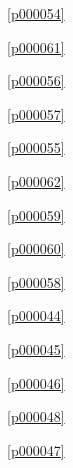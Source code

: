 \noindent\figurename\ \ref{p000054}\dotfill\pageref{p000054}

\noindent\figurename\ \ref{p000061}\dotfill\pageref{p000061}

\noindent\figurename\ \ref{p000056}\dotfill\pageref{p000056}

\noindent\figurename\ \ref{p000057}\dotfill\pageref{p000057}

\noindent\figurename\ \ref{p000055}\dotfill\pageref{p000055}

\noindent\figurename\ \ref{p000062}\dotfill\pageref{p000062}

\noindent\figurename\ \ref{p000059}\dotfill\pageref{p000059}

\noindent\figurename\ \ref{p000060}\dotfill\pageref{p000060}

\noindent\figurename\ \ref{p000058}\dotfill\pageref{p000058}

\noindent\figurename\ \ref{p000044}\dotfill\pageref{p000044}

\noindent\figurename\ \ref{p000045}\dotfill\pageref{p000045}

\noindent\figurename\ \ref{p000046}\dotfill\pageref{p000046}

\noindent\figurename\ \ref{p000048}\dotfill\pageref{p000048}

\noindent\figurename\ \ref{p000047}\dotfill\pageref{p000047}









